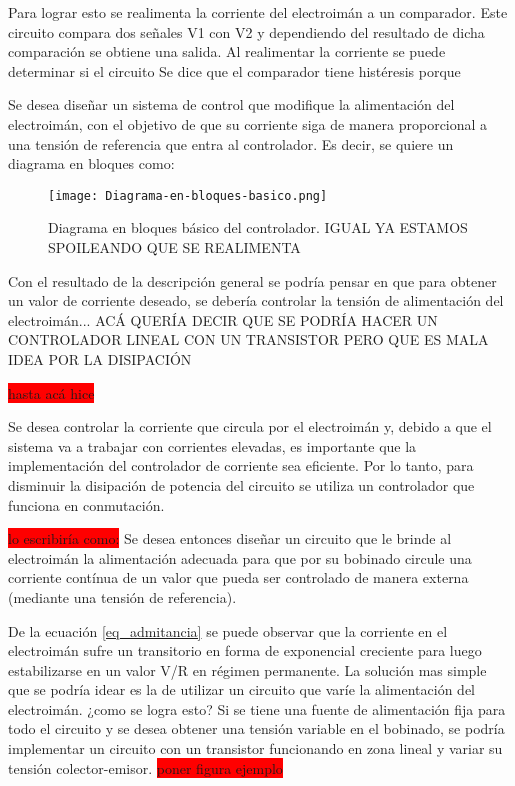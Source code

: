 Para lograr esto se realimenta la corriente del electroimán a un comparador. Este circuito compara dos señales V1 con V2 y dependiendo del resultado de dicha comparación se obtiene una salida. Al realimentar la corriente se puede determinar si el circuito 
Se dice que el comparador tiene histéresis porque



Se desea diseñar un sistema de control que modifique la alimentación del electroimán, con el objetivo de que su corriente siga de manera proporcional a una tensión de referencia que entra al controlador. Es decir, se quiere un diagrama en bloques como: 

\begin{figure}[H]
	\centering
	\texttt{[image: Diagrama-en-bloques-basico.png]}
	\caption{Diagrama en bloques básico del controlador. IGUAL YA ESTAMOS SPOILEANDO QUE SE REALIMENTA}
	\label{fig:img_diagrama_bloques_basico}
\end{figure}

Con el resultado de la descripción general se podría pensar en que para obtener un valor de corriente deseado, se debería controlar la tensión de alimentación del electroimán... ACÁ QUERÍA DECIR QUE SE PODRÍA HACER UN CONTROLADOR LINEAL CON UN TRANSISTOR PERO QUE ES MALA IDEA POR LA DISIPACIÓN 

\colorbox{red}{hasta acá hice}

\noindent Se desea controlar la corriente que circula por el electroimán y, debido a que el sistema va a trabajar con corrientes elevadas, es importante que la implementación del controlador de corriente sea eficiente. Por lo tanto, para disminuir la disipación de potencia del circuito se utiliza un controlador que funciona en conmutación.

\colorbox{red}{lo escribiría como:}
Se desea entonces diseñar un circuito que le brinde al electroimán la alimentación adecuada para que por su bobinado circule una corriente contínua de un valor que pueda ser controlado de manera externa (mediante una tensión de referencia).

De la ecuación \ref{eq_admitancia} se puede observar que la corriente en el electroimán sufre un transitorio en forma de exponencial creciente para luego estabilizarse en un valor V/R en régimen permanente. La solución mas simple que se podría idear es la de utilizar un circuito que varíe la alimentación del electroimán. ¿como se logra esto? Si se tiene una fuente de alimentación fija para todo el circuito y se desea obtener una tensión variable en el bobinado, se podría implementar un circuito con un transistor funcionando en zona lineal y variar su tensión colector-emisor. \colorbox{red}{poner figura ejemplo}

